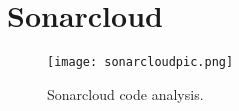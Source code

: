 \section{Sonarcloud}
\label{appendix:sonarcloud}
\begin{figure}[H]
    \begin{center}
        \texttt{[image: sonarcloudpic.png]}
    \end{center}
    \caption{Sonarcloud code analysis.}
    \label{fig:sonarcloud-dashboard}
\end{figure}
